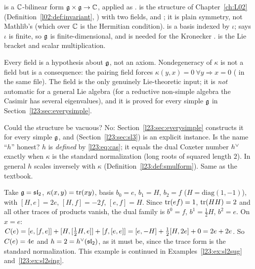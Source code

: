 \begin{dictionary}
 is a ${\mathbb{C}}$-bilinear form $\mathfrak g\times\mathfrak g\to{\mathbb{C}}$, applied as .
 is the structure of Chapter~\ref{ch:L02} (Definition~\ref{l02:def:invariant},
) with two fields,  and
; it is plain symmetry, not Mathlib's  (which over
${\mathbb{C}}$ is the Hermitian condition).  is a basis indexed by $\iota$; \lean{[Fintype ι]} says
$\iota$ is finite, so $\mathfrak g$ is finite-dimensional, and \lean{[DecidableEq ι]} is needed for the Kronecker
.  is the Lie bracket and  scalar multiplication.

Every field is a hypothesis about $\mathfrak g$, not an axiom. Nondegeneracy of $\kappa$ is not a field but is a
consequence: the pairing field forces $\kappa(y,x)=0\ \forall y\Rightarrow x=0$
( in the same file). The field  is the only genuinely
Lie-theoretic input; it is \emph{not} automatic for a general Lie algebra (for a reductive non-simple algebra
the Casimir has several eigenvalues), and it is proved for every simple $\mathfrak g$ in
Section~\ref{l23:sec:everysimple}.

Could the structure be vacuous? No: Section~\ref{l23:sec:everysimple} constructs it for every simple $\mathfrak g$, and
 (Section~\ref{l23:sec:sl3}) is an explicit instance. Is the name ``$h$'' honest? $h$ is
\emph{defined} by \eqref{l23:eq:cas}; it equals the dual Coxeter number $h^\vee$ exactly when $\kappa$ is the
standard normalization (long roots of squared length $2$). In general $h$ scales inversely with $\kappa$
(Definition~\ref{l23:def:smulform}). Same as the textbook.
\end{dictionary}

\begin{example}\label{l23:ex:sl2}
Take $\mathfrak g=\mathfrak{sl}_2$, $\kappa(x,y)=\operatorname{tr}(xy)$, basis $b_0=e$, $b_1=H$, $b_2=f$ ($H=\mathrm{diag}(1,-1)$), with
$[H,e]=2e$, $[H,f]=-2f$, $[e,f]=H$. Since $\operatorname{tr}(ef)=1$, $\operatorname{tr}(HH)=2$ and all other traces of products vanish, the dual family is
$b^0=f$, $b^1=\tfrac12H$, $b^2=e$. On $x=e$:
$C(e)=[e,[f,e]]+[H,[\tfrac12H,e]]+[f,[e,e]]=[e,-H]+\tfrac12[H,2e]+0=2e+2e$. So $C(e)=4e$ and
$h=2=h^\vee(\mathfrak{sl}_2)$, as it must be, since the trace form is the standard normalization. This example is
continued in Examples~\ref{l23:ex:sl2sug} and~\ref{l23:ex:sl2sing}.
\end{example}

